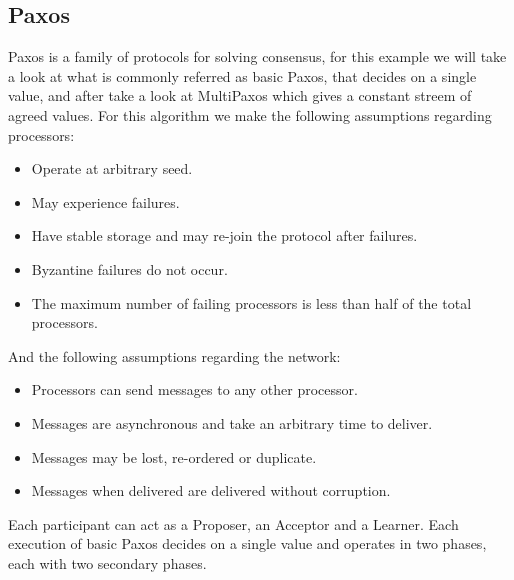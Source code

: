 \subsection{Paxos}
\label{sub:paxos}

Paxos \cite{paxos} is a family of protocols for solving consensus, for this example we will take
a look at what is commonly referred as basic Paxos, that decides on a single value, 
and after take a look at MultiPaxos which gives a constant streem of agreed values. 
For this algorithm we make the following assumptions regarding processors:
\begin{itemize}
  \item Operate at arbitrary seed.
  \item May experience failures.
  \item Have stable storage and may re-join the protocol after failures.
  \item Byzantine failures do not occur.
  \item The maximum number of failing processors is less than half of the total processors.
\end{itemize}
And the following assumptions regarding the network:
\begin{itemize}
  \item Processors can send messages to any other processor.
  \item Messages are asynchronous and take an arbitrary time to deliver.
  \item Messages may be lost, re-ordered or duplicate.
  \item Messages when delivered are delivered without corruption.
\end{itemize}

Each participant can act as a Proposer, an Acceptor and a Learner. Each execution 
of basic Paxos decides on a single value and operates in two phases, each with two
secondary phases.

